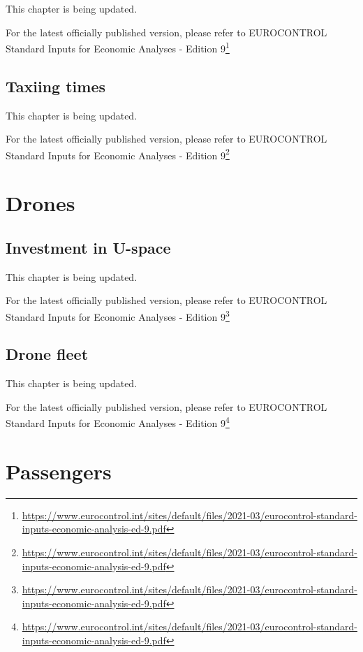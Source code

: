 \documentclass[
  11pt,
  a4paper,
]{book}
\DeclareRobustCommand{\href}[2]{#2\footnote{\url{#1}}}
\begin{document}
This chapter is being updated.

For the latest officially published version, please refer to
\href{https://www.eurocontrol.int/sites/default/files/2021-03/eurocontrol-standard-inputs-economic-analysis-ed-9.pdf}{EUROCONTROL
Standard Inputs for Economic Analyses - Edition 9}

\hypertarget{sec-taxiing-times}{%
\chapter{Taxiing times}\label{sec-taxiing-times}}

This chapter is being updated.

For the latest officially published version, please refer to
\href{https://www.eurocontrol.int/sites/default/files/2021-03/eurocontrol-standard-inputs-economic-analysis-ed-9.pdf}{EUROCONTROL
Standard Inputs for Economic Analyses - Edition 9}

\part{Drones}

\hypertarget{sec-investment-in-u-space}{%
\chapter{Investment in U-space}\label{sec-investment-in-u-space}}

This chapter is being updated.

For the latest officially published version, please refer to
\href{https://www.eurocontrol.int/sites/default/files/2021-03/eurocontrol-standard-inputs-economic-analysis-ed-9.pdf}{EUROCONTROL
Standard Inputs for Economic Analyses - Edition 9}

\hypertarget{sec-drone-fleet}{%
\chapter{Drone fleet}\label{sec-drone-fleet}}

This chapter is being updated.

For the latest officially published version, please refer to
\href{https://www.eurocontrol.int/sites/default/files/2021-03/eurocontrol-standard-inputs-economic-analysis-ed-9.pdf}{EUROCONTROL
Standard Inputs for Economic Analyses - Edition 9}

\part{Passengers}
\end{document}
